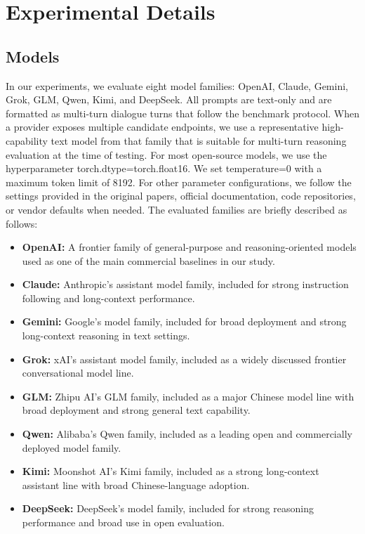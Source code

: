 \section{Experimental Details}
\subsection{Models}
In our experiments, we evaluate eight model families: OpenAI, Claude, Gemini, Grok, GLM, Qwen, Kimi, and DeepSeek. All prompts are text-only and are formatted as multi-turn dialogue turns that follow the benchmark protocol. When a provider exposes multiple candidate endpoints, we use a representative high-capability text model from that family that is suitable for multi-turn reasoning evaluation at the time of testing. For most open-source models, we use the hyperparameter torch.dtype=torch.float16. We set temperature=0 with a maximum token limit of 8192. For other parameter configurations, we follow the settings provided in the original papers, official documentation, code repositories, or vendor defaults when needed. The evaluated families are briefly described as follows:

\begin{itemize}
    \item \textbf{OpenAI:} A frontier family of general-purpose and reasoning-oriented models used as one of the main commercial baselines in our study.
    \item \textbf{Claude:} Anthropic's assistant model family, included for strong instruction following and long-context performance.
    \item \textbf{Gemini:} Google's model family, included for broad deployment and strong long-context reasoning in text settings.
    \item \textbf{Grok:} xAI's assistant model family, included as a widely discussed frontier conversational model line.
    \item \textbf{GLM:} Zhipu AI's GLM family, included as a major Chinese model line with broad deployment and strong general text capability.
    \item \textbf{Qwen:} Alibaba's Qwen family, included as a leading open and commercially deployed model family.
    \item \textbf{Kimi:} Moonshot AI's Kimi family, included as a strong long-context assistant line with broad Chinese-language adoption.
    \item \textbf{DeepSeek:} DeepSeek's model family, included for strong reasoning performance and broad use in open evaluation.
\end{itemize}



